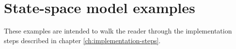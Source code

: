
\chapter{State-space model examples}

These examples are intended to walk the reader through the implementation steps
described in chapter \ref{ch:implementation-steps}.







